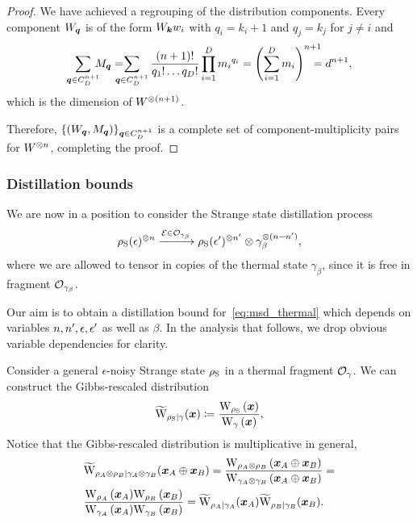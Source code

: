 \documentclass[pra,
aps,
twocolumn,
superscriptaddress,
groupedaddress,
nofootinbib,
reprint
]{revtex4-1}
\begin{document}
\begin{proof}
We have achieved a regrouping of the distribution components.
Every component $W_{\bmq}$ is of the form $W_{\bmk} w_i$ with $q_i = k_i + 1$ and $q_j = k_j$ for $j\neq i$ and 
\begin{align*}
	\sum_{\bmq \in C_D^{n+1}}  \hspace{-6pt} M_{\bmq} =  \hspace{-10pt} \sum_{\bmq \in C_D^{n+1}} \frac{(n+1)!}{q_1!\dots q_D!} \prod\limits_{i=1}^D {m_i}^{q_i} = 
	\left( \sum_{i=1}^D m_i \right)^{n+1} \hspace{-10pt} = d^{n+1},
\end{align*}
which is the dimension of $W\too{(n+1)}$.

Therefore, $\{ (W_{\bmq}, M_{\bmq}) \}_{\bmq \in C_D^{n+1}}$ is a complete set of component-multiplicity pairs for $W\too{n}$, completing the proof.
\end{proof}

\subsubsection{Distillation bounds}

We are now in a position to consider the Strange state distillation process
\begin{equation}\label{eq:msd_thermal}
		\noisys(\epsilon)\too{n} \xrightarrow{\E \in \O_{\gamma_\beta}} \noisys(\epsilon')\too{\tt} \otimes \gamma_\beta\too{(n-\tt)},
\end{equation}
where we are allowed to tensor in copies of the thermal state $\gamma_\beta$, since it is free in fragment $\O_{\gamma_\beta}$.

Our aim is to obtain a distillation bound for~\cref{eq:msd_thermal} which depends on variables $n, \tt, \epsilon, \epsilon'$ as well as $\beta$.
In the analysis that follows, we drop obvious variable dependencies for clarity.

Consider a general $\epsilon$-noisy Strange state $\noisys$ in a thermal fragment $\O_{\gamma}$.
We can construct the Gibbs-rescaled distribution 
\begin{equation}
	\widetilde{\rm{W}}_{\noisys|\gamma}(\bmx) \coloneqq \frac{\W[\bmx]{\noisys}}{\W[\bmx]{\gamma}},
\end{equation}
Notice that the Gibbs-rescaled distribution is multiplicative in general,
\begin{align}
	&\widetilde{\rm{W}}_{\rho_A \otimes \rho_B | \gamma_A \otimes \gamma_B}(\bmx_A \oplus \bmx_B) = \frac{\W[\bmx_A \oplus \bmx_B]{\rho_A \otimes \rho_B}}{\W[\bmx_A \oplus \bmx_B]{\gamma_A \otimes \gamma_B}} = \nonumber \\
	&\frac{\W[\bmx_A]{\rho_A}\W[\bmx_B]{\rho_B}}{\W[\bmx_A]{\gamma_A}\W[\bmx_B]{\gamma_B}} = \widetilde{\rm{W}}_{\rho_A | \gamma_A}(\bmx_A)\widetilde{\rm{W}}_{\rho_B  | \gamma_B}(\bmx_B).
\end{align}
\end{document}
